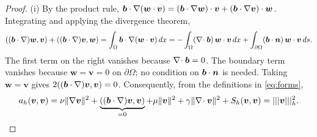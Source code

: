 \begin{proof}
(i) By the product rule, $\boldsymbol b\cdot\nabla(\bm w\cdot\bm v)=(\boldsymbol b\cdot\nabla\bm w)\cdot\bm v+(\boldsymbol b\cdot\nabla\bm v)\cdot\bm w$. Integrating and applying the divergence theorem,
\[
((\boldsymbol b\cdot\nabla)\bm w,\bm v)+((\boldsymbol b\cdot\nabla)\bm v,\bm w)=\int_\Omega\boldsymbol b\cdot\nabla(\bm w\cdot\bm v)\,dx
=-\int_\Omega(\nabla\!\cdot\boldsymbol b)\,\bm w\cdot\bm v\,dx+\int_{\partial\Omega}(\boldsymbol b\cdot\bm n)\,\bm w\cdot\bm v\,ds .
\]
The first term on the right vanishes because $\nabla\!\cdot\boldsymbol b=0$. The boundary term vanishes because $\bm w=\bm v=0$ on $\partial\Omega$; no condition on $\boldsymbol b\cdot\bm n$ is needed. Taking $\bm w=\bm v$ gives $2((\boldsymbol b\cdot\nabla)\bm v,\bm v)=0$. Consequently, from the definitions in \eqref{eq:forms},
\[
a_h(\bm v,\bm v)=\nu\|\nabla\bm v\|^2+\underbrace{((\boldsymbol b\cdot\nabla)\bm v,\bm v)}_{=0}+\mu\|\bm v\|^2+\gamma\|\nabla\!\cdot\bm v\|^2+S_h(\bm v,\bm v)=|||\bm v|||_h^2 .
\]


\end{proof}
